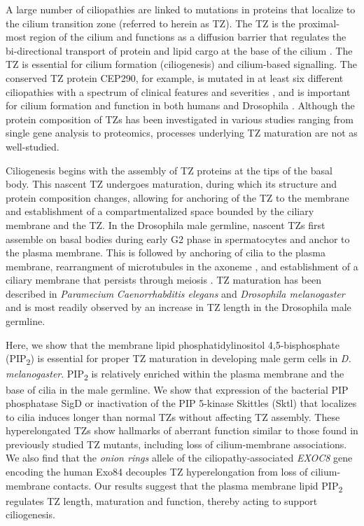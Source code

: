 \documentclass[12pt, twoside, letterpaper]{article}
\newcommand{\PIP}{PIP\textsubscript{2}}
\begin{document}
A large number of ciliopathies are linked to mutations in proteins that
localize to the cilium transition zone (referred to herein as TZ).
The TZ is the proximal-most region of the cilium and
functions as a diffusion barrier that regulates the
bi-directional transport of protein and lipid cargo at the base of the cilium
\citep{reiter2012base, szymanska2012transition}.
The TZ is essential for cilium formation (ciliogenesis) and cilium-based
signalling.
The conserved TZ protein CEP290, for example, is mutated in at least
six different ciliopathies with a spectrum of clinical features and severities
, and is important for cilium formation
and function in both humans \citep{shimada2017vitro, stowe2012centriolar}
and Drosophila \citep{basiri2014migrating}.
Although the protein composition of TZs has been investigated in various
studies ranging from single gene analysis to proteomics,
processes underlying TZ maturation are not as well-studied.

Ciliogenesis begins with the assembly of TZ proteins at the tips of
the basal body.
This nascent TZ undergoes maturation, during which its structure and protein
composition changes, allowing for anchoring of the TZ to the membrane and
establishment of a compartmentalized space bounded by the ciliary membrane
and the TZ.
In the Drosophila male germline, nascent TZs first assemble on basal bodies
during early G2 phase in spermatocytes and anchor to the plasma membrane.
This is followed by anchoring of cilia to the plasma membrane,
rearrangment of microtubules in the axoneme \citep{gottardo2013cilium},
and establishment of a
ciliary membrane that persists through meiosis \citep{riparbelli2012assembly}.
TZ maturation has been described in
\textit{Paramecium} \citep{aubusson2015transition}
\textit{Caenorrhabditis elegans} \citep{serwas2017centrioles} and
\textit{Drosophila melanogaster} \citep{gottardo2013cilium}
and is most readily observed by an increase in TZ length
in the Drosophila male germline.

Here, we show that the membrane lipid phosphatidylinositol 4,5-bisphosphate (\PIP{})
is essential for proper TZ maturation in developing male germ cells
in \textit{D. melanogaster}.
\PIP{} is relatively enriched within the plasma membrane and the base of cilia
in the male germline.
We show that expression of the bacterial PIP phosphatase SigD
or inactivation of the PIP 5-kinase Skittles (Sktl) that localizes to cilia
induces longer than normal TZs without affecting TZ assembly.
These hyperelongated TZs show hallmarks of aberrant function similar to those
found in previously studied TZ mutants,
including loss of cilium-membrane associations.
We also find that the \textit{onion rings} allele of the
ciliopathy-associated \textit{EXOC8} gene encoding the human Exo84
decouples TZ hyperelongation from loss of cilium-membrane contacts.
Our results suggest that the plasma membrane lipid \PIP{} regulates TZ length,
maturation and function, thereby acting to support ciliogenesis.
\end{document}
